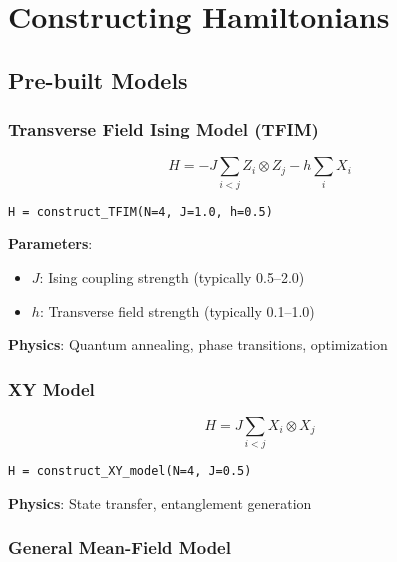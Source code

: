 \documentclass[11pt,a4paper]{article}
\begin{document}
\section{Constructing Hamiltonians}

\subsection{Pre-built Models}

\subsubsection{Transverse Field Ising Model (TFIM)}

\begin{equation}
    H = -J \sum_{i<j} Z_i \otimes Z_j - h \sum_i X_i
\end{equation}

\begin{lstlisting}[caption={TFIM construction}]
H = construct_TFIM(N=4, J=1.0, h=0.5)
\end{lstlisting}

\textbf{Parameters}:
\begin{itemize}
    \item $J$: Ising coupling strength (typically 0.5--2.0)
    \item $h$: Transverse field strength (typically 0.1--1.0)
\end{itemize}

\textbf{Physics}: Quantum annealing, phase transitions, optimization

\subsubsection{XY Model}

\begin{equation}
    H = J \sum_{i<j} X_i \otimes X_j
\end{equation}

\begin{lstlisting}[caption={XY model construction}]
H = construct_XY_model(N=4, J=0.5)
\end{lstlisting}

\textbf{Physics}: State transfer, entanglement generation

\subsubsection{General Mean-Field Model}
\end{document}
